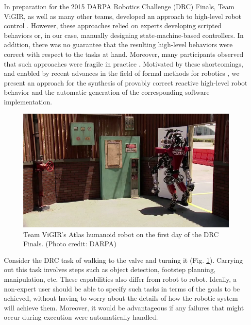 
In preparation for the 2015 DARPA Robotics Challenge (DRC) Finals, Team ViGIR, as well as many other teams, developed an approach to high-level robot control \cite{Philipp2013Bsc, Philipp2015MSc}.
However, these approaches relied on experts developing scripted behaviors or, in our case, manually designing state-machine-based controllers.
In addition, there was no guarantee that the resulting high-level behaviors were correct with respect to the tasks at hand.
Moreover, many participants observed that such approaches were fragile in practice \cite{DRC-what-happened}.
Motivated by these shortcomings, and enabled by recent advances in the field of formal methods for robotics 
\cite{Vasu2013ICRA, Vasu2015TRO, JFRKG2012ICRA, Lignos2015AURO, Kavraki2015AAAI, Kavraki2015ICRA, Belta2014TAC, Fainekos2014ICRA, Dimos2014ICRA, Jon2015ICRA, Ben2015IJRR, Wolff2014ICRA, Ankur2015ISRR, Finucane2010IROS, Topcu2011RAM}, 
we present an approach for the synthesis of provably correct reactive high-level robot behavior and the 
automatic generation of the corresponding software implementation.

\begin{figure}[t]
\centering
\includegraphics[width=0.99\columnwidth,clip]{./img/atlas_door_finals.png}
\caption{Team ViGIR's Atlas humanoid robot on the first day of the DRC Finals. (Photo credit: DARPA)
}
\label{Fig:AtlasDoorFinals}
\vspace{-10pt}
\end{figure}

\begin{myExample}\label{Ex:PickupObject}
	Consider the DRC task of walking to the valve and turning it (Fig. \ref{Fig:AtlasDoorFinals}).
	Carrying out this task involves steps such as object detection, footstep planning, manipulation, etc.
	These capabilities also differ from robot to robot.
	Ideally, a non-expert user should be able to specify such tasks in terms of the goals to be achieved, without having to worry about the details of how the robotic system will achieve them.
	Moreover, it would be advantageous if any failures that might occur during execution were automatically handled.
\end{myExample}

